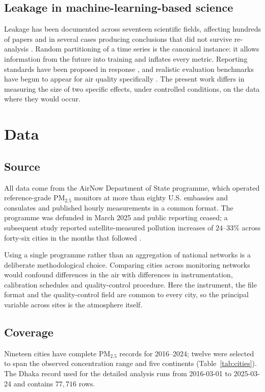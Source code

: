 \documentclass[conference,a4paper]{IEEEtran}
\begin{document}
\subsection{Leakage in machine-learning-based science}
Leakage has been documented across seventeen scientific fields, affecting
hundreds of papers and in several cases producing conclusions that did not
survive re-analysis \cite{kapoor}. Random partitioning of a time series is the
canonical instance: it allows information from the future into training and
inflates every metric. Reporting standards have been proposed in response
\cite{reforms}, and realistic evaluation benchmarks have begun to appear for air
quality specifically \cite{aqbench}. The present work differs in measuring the
size of two specific effects, under controlled conditions, on the data where
they would occur.

\section{Data}

\subsection{Source}
All data come from the AirNow Department of State programme, which operated
reference-grade PM$_{2.5}$ monitors at more than eighty U.S. embassies and
consulates and published hourly measurements in a common format. The programme
was defunded in March 2025 and public reporting ceased; a subsequent study
reported satellite-measured pollution increases of $24$--$33\%$ across
forty-six cities in the months that followed \cite{shutdown}.

Using a single programme rather than an aggregation of national networks is a
deliberate methodological choice. Comparing cities across monitoring networks
would confound differences in the air with differences in instrumentation,
calibration schedules and quality-control procedure. Here the instrument, the
file format and the quality-control field are common to every city, so the
principal variable across sites is the atmosphere itself.

\subsection{Coverage}
Nineteen cities have complete PM$_{2.5}$ records for 2016--2024; twelve were
selected to span the observed concentration range and five continents
(Table~\ref{tab:cities}). The Dhaka record used for the detailed analysis runs
from 2016-03-01 to 2025-03-24 and contains $77{,}716$ rows.
\end{document}
